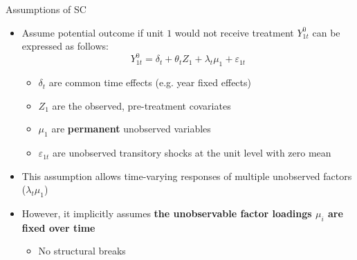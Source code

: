 \documentclass[dvipsnames,hyperref={pdfpagelabels=false}]{beamer}
\begin{document}
%		




\begin{frame}{Assumptions of SC}
	\begin{itemize}
		\item Assume potential outcome if unit $1$ would not receive treatment $Y^0_{1t}$ can be expressed as follows:
		\begin{equation*}
			Y^0_{1t}=\delta_t+\theta_tZ_1+\lambda_t\mu_1+\varepsilon_{1t}
\end{equation*}
		\begin{itemize}
			\item $\delta_t$ are common time effects (e.g. year fixed effects)
			\vspace{0.2cm}
			\item $Z_1$ are the observed, pre-treatment covariates
			\vspace{0.2cm}
			\item $\mu_1$ are \textbf{permanent} unobserved variables
			\vspace{0.2cm}
			\item $\varepsilon_{1t}$ are unobserved transitory shocks at the unit level with zero mean
			\vspace{0.2cm}
		\end{itemize}
		\item This assumption allows time-varying responses of multiple unobserved factors ($\lambda_t\mu_1$) 
		
		\vspace{0.2cm}
		\item However, it implicitly assumes \textbf{the unobservable factor loadings $\mu_i$ are fixed over time} 
		\vspace{0.2cm}
		\begin{itemize}
			\item No structural breaks
		\end{itemize}
		
		
	\end{itemize}
\end{frame}
\end{document}
